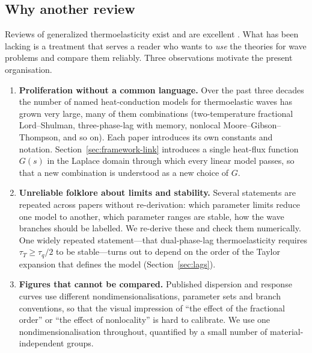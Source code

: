 \subsection{Why another review}
Reviews of generalized thermoelasticity exist and are excellent \citep{Chandrasekharaiah1986,Chandrasekharaiah1998,HetnarskiIgnaczak1999,HetnarskiIgnaczak2000,Shakeriaski2021,Huang2025}. What has been lacking is a treatment that serves a reader who wants to \emph{use} the theories for wave problems and compare them reliably. Three observations motivate the present organisation.
\begin{enumerate}
\item \textbf{Proliferation without a common language.} Over the past three decades the number of named heat-conduction models for thermoelastic waves has grown very large, many of them combinations (two-temperature fractional Lord--Shulman, three-phase-lag with memory, nonlocal Moore--Gibson--Thompson, and so on). Each paper introduces its own constants and notation. Section~\ref{sec:framework-link} introduces a single heat-flux function $G(s)$ in the Laplace domain through which every linear model passes, so that a new combination is understood as a new choice of $G$.
\item \textbf{Unreliable folklore about limits and stability.} Several statements are repeated across papers without re-derivation: which parameter limits reduce one model to another, which parameter ranges are stable, how the wave branches should be labelled. We re-derive these and check them numerically. One widely repeated statement---that dual-phase-lag thermoelasticity requires $\tau_T\ge\tau_q/2$ to be stable---turns out to depend on the order of the Taylor expansion that defines the model (Section~\ref{sec:lags}).
\item \textbf{Figures that cannot be compared.} Published dispersion and response curves use different nondimensionalisations, parameter sets and branch conventions, so that the visual impression of ``the effect of the fractional order'' or ``the effect of nonlocality'' is hard to calibrate. We use one nondimensionalisation throughout, quantified by a small number of material-independent groups.
\end{enumerate}

